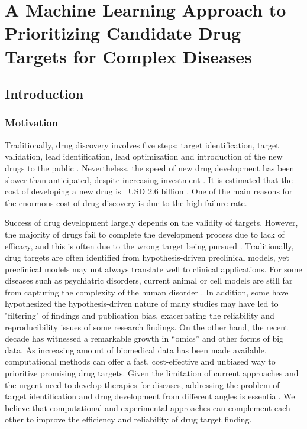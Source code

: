 \chapter{A Machine Learning Approach to Prioritizing Candidate Drug Targets for Complex Diseases}

\label{chap:Target}

\section{Introduction}
  \subsection{Motivation}
    Traditionally, drug discovery involves five steps: target identification, target validation, lead identification, lead optimization and introduction of the new drugs to the public \cite{phoebe2008identifying}. Nevertheless, the speed of new drug development has been slower than anticipated, despite increasing investment \cite{pammolli2011productivity}. It is estimated that the cost of developing a new drug is ~USD 2.6 billion \cite{van1998socio}. One of the main reasons for the enormous cost of drug discovery is due to the high failure rate. 

    Success of drug development largely depends on the validity of targets. However, the majority of drugs fail to complete the development process due to lack of efficacy, and this is often due to the wrong target being pursued \cite{shih2018drug}. Traditionally, drug targets are often identified from hypothesis-driven preclinical models, yet preclinical models may not always translate well to clinical applications. For some diseases such as psychiatric disorders, current animal or cell models are still far from capturing the complexity of the human disorder \cite{nestler2010animal}. In addition, some have hypothesized the hypothesis-driven nature of many studies may have led to "filtering" of findings and publication bias, exacerbating the reliability and reproducibility issues of some research findings. On the other hand, the recent decade has witnessed a remarkable growth in “omics” and other forms of big data. As increasing amount of biomedical data has been made available, computational methods can offer a fast, cost-effective and unbiased way to prioritize promising drug targets. Given the limitation of current approaches and the urgent need to develop therapies for diseases, addressing the problem of target identification and drug development from different angles is essential. We believe that computational and experimental approaches can complement each other to improve the efficiency and reliability of drug target finding.  

